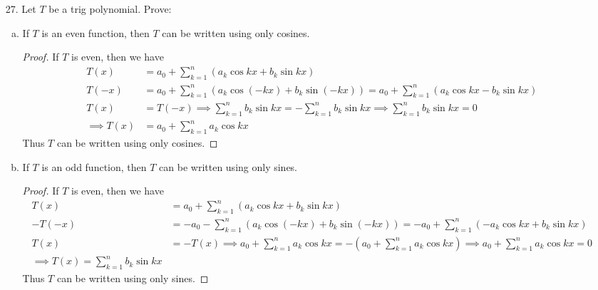 \documentclass{article}
\begin{document}
\begin{itemize}
	\item[27.] Let $T$ be a trig polynomial. Prove:
		\begin{enumerate}[(a)]
			\item If $T$ is an even function, then $T$ can be written using only cosines.
				\begin{proof}
					If $T$ is even, then we have
					\begin{align*}
						T(x) &= a_0 + \sum_{k=1}^{n} (a_k \cos kx + b_k \sin kx) \\
						T(-x) &= a_0 + \sum_{k=1}^{n} (a_k\cos (-kx) + b_k\sin(-kx)) = a_0 + \sum_{k=1}^{n} (a_k\cos kx - b_k\sin kx) \\
						T(x) &= T(-x) \implies \sum_{k=1}^{n} b_k\sin kx = -\sum_{k=1}^{n} b_k\sin kx \implies \sum_{k=1}^{n} b_k\sin kx = 0 \\
						\implies T(x) &= a_0 + \sum_{k=1}^{n} a_k\cos kx
					\end{align*}
					Thus $T$ can be written using only cosines.
				\end{proof}

			\item If $T$ is an odd function, then $T$ can be written using only sines.
				\begin{proof}
					If $T$ is even, then we have
					\begin{align*}
						T(x) &= a_0 + \sum_{k=1}^{n} (a_k\cos kx + b_k \sin kx) \\
						-T(-x) &= -a_0 - \sum_{k=1}^{n} (a_k \cos (-kx) + b_k \sin(-kx)) = -a_0 + \sum_{k=1}^{n} (-a_k \cos kx + b_k\sin kx) \\
						T(x) &= -T(x) \implies a_0 + \sum_{k=1}^{n} a_k \cos kx = -\left(a_0 + \sum_{k=1}^{n} a_k\cos kx\right) \implies a_0 + \sum_{k=1}^{n} a_k\cos kx = 0 \\
						\implies T(x) = \sum_{k=1}^{n} b_k \sin kx
					\end{align*}
					Thus $T$ can be written using only sines.
				\end{proof}
				
		\end{enumerate}
		
\end{itemize}
\end{document}
